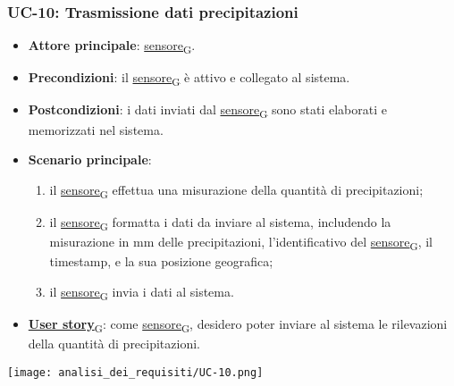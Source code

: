 \subsubsection{UC-10: Trasmissione dati precipitazioni}
\begin{itemize}
	\item \textbf{Attore principale}: \href{https://7last.github.io/docs/pb/documentazione-interna/glossario\#sensore}{sensore\textsubscript{G}}.
	\item \textbf{Precondizioni}: il \href{https://7last.github.io/docs/pb/documentazione-interna/glossario\#sensore}{sensore\textsubscript{G}} è attivo e collegato al sistema.
	\item \textbf{Postcondizioni}: i dati inviati dal \href{https://7last.github.io/docs/pb/documentazione-interna/glossario\#sensore}{sensore\textsubscript{G}} sono stati elaborati e memorizzati nel sistema.
	\item \textbf{Scenario principale}:
	      \begin{enumerate}
		      \item il \href{https://7last.github.io/docs/pb/documentazione-interna/glossario\#sensore}{sensore\textsubscript{G}} effettua una misurazione della quantità di precipitazioni;
		      \item il \href{https://7last.github.io/docs/pb/documentazione-interna/glossario\#sensore}{sensore\textsubscript{G}} formatta i dati da inviare al sistema, includendo la misurazione in mm delle precipitazioni, l'identificativo del \href{https://7last.github.io/docs/pb/documentazione-interna/glossario\#sensore}{sensore\textsubscript{G}},
		            il timestamp, e la sua posizione geografica;
		      \item il \href{https://7last.github.io/docs/pb/documentazione-interna/glossario\#sensore}{sensore\textsubscript{G}} invia i dati al sistema.
	      \end{enumerate}
	\item \href{https://7last.github.io/docs/pb/documentazione-interna/glossario\#user-story}{\textbf{User story}\textsubscript{G}}: come \href{https://7last.github.io/docs/pb/documentazione-interna/glossario\#sensore}{sensore\textsubscript{G}}, desidero poter inviare al sistema le rilevazioni della quantità di precipitazioni.
\end{itemize}

\begin{center}
	\texttt{[image: analisi\_dei\_requisiti/UC-10.png]}
\end{center}
